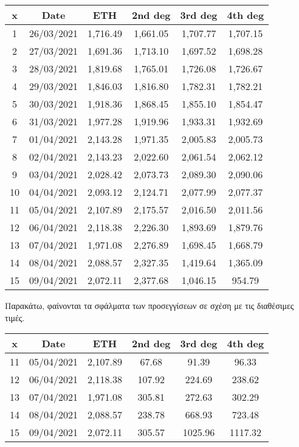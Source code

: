 \documentclass{article}
\newcommand{\lt}{\latintext}
\newcommand{\gt}{\greektext}
\begin{document}
\lt
\begin{center}
\begin{tabular}{ |c|c|c|c|c|c| }
\hline
x & Date & ETH & 2nd deg & 3rd deg & 4th deg \\
\hline
1 & 26/03/2021 & 1,716.49 & 1,661.05 & 1,707.77 & 1,707.15\\
2 & 27/03/2021 & 1,691.36 & 1,713.10 & 1,697.52 & 1,698.28\\
3 & 28/03/2021 & 1,819.68 & 1,765.01 & 1,726.08 & 1,726.67\\
4 & 29/03/2021 & 1,846.03 & 1,816.80 & 1,782.31 & 1,782.21\\
5 & 30/03/2021 & 1,918.36 & 1,868.45 & 1,855.10 & 1,854.47\\
6 & 31/03/2021 & 1,977.28 & 1,919.96 & 1,933.31 & 1,932.69\\
7 & 01/04/2021 & 2,143.28 & 1,971.35 & 2,005.83 & 2,005.73\\
8 & 02/04/2021 & 2,143.23 & 2,022.60 & 2,061.54 & 2,062.12\\
9 & 03/04/2021 & 2,028.42 & 2,073.73 & 2,089.30 & 2,090.06\\
10 & 04/04/2021 & 2,093.12 & 2,124.71 & 2,077.99 & 2,077.37\\
\hline
11 & 05/04/2021 & 2,107.89 & 2,175.57 & 2,016.50 & 2,011.56\\
12 & 06/04/2021 & 2,118.38 & 2,226.30 & 1,893.69 & 1,879.76\\
13 & 07/04/2021 & 1,971.08 & 2,276.89 & 1,698.45 & 1,668.79\\
14 & 08/04/2021 & 2,088.57 & 2,327.35 & 1,419.64 & 1,365.09\\
15 & 09/04/2021 & 2,072.11 & 2,377.68 & 1,046.15 & 954.79\\
\hline
\end{tabular}
\end{center}
\gt
Παρακάτω, φαίνονται τα σφάλματα των προσεγγίσεων σε σχέση με τις διαθέσιμες τιμές.
\lt
\begin{center}
\begin{tabular}{ |c|c|c|c|c|c| }
\hline
x & Date & ETH & 2nd deg & 3rd deg & 4th deg \\
\hline
11 & 05/04/2021 & 2,107.89 & 67.68 & 91.39 & 96.33\\
12 & 06/04/2021 & 2,118.38 & 107.92 & 224.69 & 238.62\\
13 & 07/04/2021 & 1,971.08 & 305.81 & 272.63 & 302.29\\
14 & 08/04/2021 & 2,088.57 & 238.78 & 668.93 & 723.48\\
15 & 09/04/2021 & 2,072.11 & 305.57 & 1025.96 & 1117.32\\
\hline
\end{tabular}
\end{center}
\end{document}
